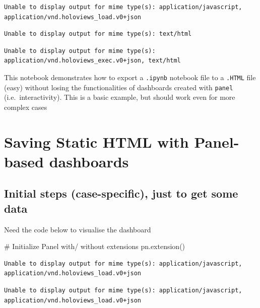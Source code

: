 \documentclass[
  letterpaper,
  DIV=11,
  numbers=noendperiod]{scrreprt}
\newenvironment{Shaded}{\begin{snugshade}}{\end{snugshade}}
\newcommand{\CommentTok}[1]{\textcolor[rgb]{0.37,0.37,0.37}{#1}}
\newcommand{\NormalTok}[1]{\textcolor[rgb]{0.00,0.23,0.31}{#1}}
\begin{document}
\begin{verbatim}
Unable to display output for mime type(s): application/javascript, application/vnd.holoviews_load.v0+json
\end{verbatim}

\begin{verbatim}
Unable to display output for mime type(s): text/html
\end{verbatim}

\begin{verbatim}
Unable to display output for mime type(s): application/vnd.holoviews_exec.v0+json, text/html
\end{verbatim}

This notebook demonstrates how to export a \texttt{.ipynb} notebook file
to a \texttt{.HTML} file (easy) without losing the functionalities of
dashboards created with \texttt{panel} (i.e.~interactivity). This is a
basic example, but should work even for more complex cases

\section{Saving Static HTML with Panel-based
dashboards}\label{saving-static-html-with-panel-based-dashboards}

\subsection{Initial steps (case-specific), just to get some
data}\label{initial-steps-case-specific-just-to-get-some-data}

Need the code below to visualise the dashboard

\begin{Shaded}
\begin{Highlighting}[]
\CommentTok{\# Initialize Panel with/ without extensions}
\NormalTok{pn.extension() }
\end{Highlighting}
\end{Shaded}

\begin{verbatim}
Unable to display output for mime type(s): application/javascript, application/vnd.holoviews_load.v0+json
\end{verbatim}

\begin{verbatim}
Unable to display output for mime type(s): application/javascript, application/vnd.holoviews_load.v0+json
\end{verbatim}
\end{document}
